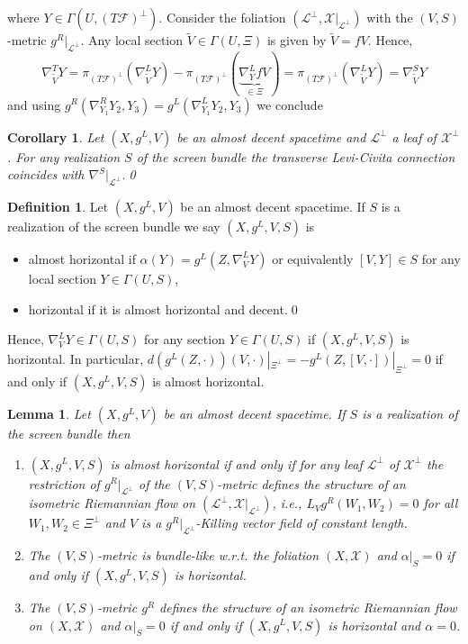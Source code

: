 \documentclass[a4paper,10pt,twoside]{amsart}
\newtheorem{lemma}[theorem]{Lemma}
\newtheorem{corollary}[theorem]{Corollary}
\theoremstyle{definition}
\newtheorem{definition}[theorem]{Definition}
\theoremstyle{remark}
\numberwithin{equation}{section}
\begin{document}
where $Y \in \Gamma(U,(T\mathcal{F})^{\perp})$. Consider the foliation $(\mathcal{L}^{\perp},\mathcal{X}|_{\mathcal{L}^{\perp}})$ with the $(V,S)$-metric
$g^{R}|_{\mathcal{L}^{\perp}}$. Any local section $\tilde{V} \in \Gamma(U,\Xi)$ is given by $\tilde{V}=fV$. Hence,
\begin{equation*}
	\nabla^{T}_{\tilde{V}}{Y} = \pi_{(T\mathcal{F})^{\perp}}(\nabla^{L}_{\tilde{V}}{Y})
						-\pi_{(T\mathcal{F})^{\perp}}(\underbrace{\nabla^{L}_{Y}{fV}}_{\in \Xi})
				= \pi_{(T\mathcal{F})^{\perp}}(\nabla^{L}_{\tilde{V}}{Y}) = \nabla^{S}_{\tilde{V}}{Y}
\end{equation*}
and using $g^{R}(\nabla^{R}_{Y_{1}}{Y_{2}},Y_{3}) = g^{L}(\nabla^{L}_{Y_{1}}{Y_{2}},Y_{3})$ we conclude
\begin{corollary}\label{transverse-levi-civita}
	Let $(X,g^{L},V)$ be an almost decent spacetime and $\mathcal{L}^{\perp}$ a leaf of $\mathcal{X}^{\perp}$. For any realization $S$ of the
	screen bundle the transverse Levi-Civita connection coincides with $\nabla^{S}|_{\mathcal{L}^{\perp}}$.\qed
\end{corollary}
\begin{definition}
	Let $(X,g^{L},V)$ be an almost decent spacetime. If $S$ is a realization of the screen bundle we say
	$(X,g^{L},V,S)$ is
	\begin{itemize}
		\item
		almost horizontal if $\alpha(Y)=g^{L}(Z,\nabla^{L}_{V}{Y})$ or equivalently $[V,Y] \in S$ for any local section $Y \in \Gamma(U,S)$,
		\item
		horizontal if it is almost horizontal and decent.\qed
	\end{itemize}
\end{definition}
Hence, $\nabla^{L}_{V}{Y} \in \Gamma(U,S)$ for any section $Y \in \Gamma(U,S)$ if $(X,g^{L},V,S)$ is horizontal. In particular, $d(g^{L}(Z,\cdot))(V,\cdot)|_{\Xi^{\perp}}=-g^{L}(Z,[V,\cdot])|_{\Xi^{\perp}}=0$ if and only if $(X,g^{L},V,S)$ is almost horizontal.
\begin{lemma}\label{horizontal-isometric-flow}
	Let $(X,g^{L},V)$ be an almost decent spacetime. If $S$ is a realization of the screen bundle then
	\begin{enumerate}
		\item
		$(X,g^{L},V,S)$ is almost horizontal if and only if for any leaf $\mathcal{L}^{\perp}$ of $\mathcal{X}^{\perp}$ the restriction of
		$g^{R}|_{\mathcal{L}^{\perp}}$ of the $(V,S)$-metric defines the structure of an isometric Riemannian flow on
		$(\mathcal{L}^{\perp},\mathcal{X}|_{\mathcal{L}^{\perp}})$, i.e., $L_{V}g^{R}(W_{1},W_{2})=0$ for all $W_{1},W_{2} \in \Xi^{\perp}$
		and $V$ is a $g^{R}|_{\mathcal{L}^{\perp}}$-Killing vector field of constant length.
		\item
		The $(V,S)$-metric is bundle-like w.r.t. the foliation $(X,\mathcal{X})$ and $\alpha|_{S}=0$ if and only if $(X,g^{L},V,S)$ is horizontal.
		\item
		The $(V,S)$-metric $g^{R}$ defines the structure of an isometric Riemannian flow on $(X,\mathcal{X})$ and $\alpha|_{S}=0$ if and only
		if $(X,g^{L},V,S)$ is horizontal and $\alpha =0$.
	\end{enumerate}
\end{lemma}
\end{document}
